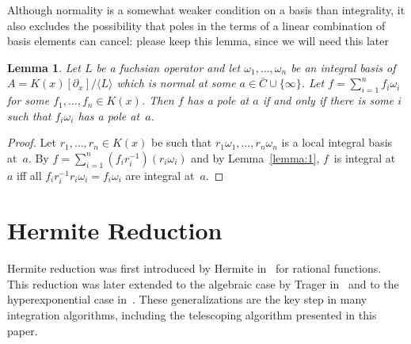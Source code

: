 \documentclass{sig-alternate}
\newtheorem{lemma}[theorem]{Lemma}
\def\<#1>{\langle#1\rangle}
\newcommand{\red}{\color{red}}
\begin{document}
Although normality is a somewhat weaker condition on a basis than integrality,
it also excludes the possibility that poles in the terms of a linear combination
of basis elements can cancel:
{\red please keep this lemma, since we will need this later}

\begin{lemma}\label{lemma:3}
  Let $L$ be a fuchsian operator and let $\omega_1,\dots,\omega_n$ be an integral basis of $A=K(x)[\partial_x]/\<L>$
  which is normal at some $a\in\bar C\cup\{\infty\}$.
  Let $f=\sum_{i=1}^n f_i\omega_i$ for some $f_1,\dots,f_n\in K(x)$.
  Then $f$ has a pole at $a$ if and only if
  there is some $i$ such that $f_i\omega_i$ has a pole at~$a$.
\end{lemma}
\begin{proof}
  Let $r_1,\dots,r_n\in K(x)$ be such that $r_1\omega_1,\dots,r_n\omega_n$ is a
  local integral basis at~$a$. By $f=\sum_{i=1}^n
  (f_ir_i^{-1})(r_i\omega_i)$ and by Lemma~\ref{lemma:1}, $f$~is integral at~$a$ iff all
  $f_ir_i^{-1}r_i\omega_i=f_i\omega_i$ are integral at~$a$.
\end{proof}

\section{Hermite Reduction}\label{sec:hermite}
Hermite reduction was first introduced by Hermite in~\cite{Hermite1872} for rational functions.
This reduction was later extended to the algebraic case by Trager in~\cite{trager84} and to the
hyperexponential case in~\cite{bostan13a}.
These generalizations are the key step in many integration
algorithms, including the telescoping algorithm presented in this paper.
\end{document}
